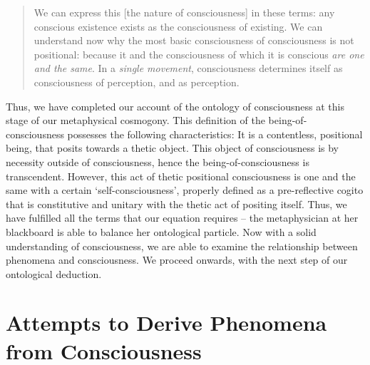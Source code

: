 \blockcquote[12]{Sartre}{We can express this [the nature of consciousness] in these terms: any conscious existence exists as the consciousness of existing. We can understand now why the most basic consciousness of consciousness is not positional: because it and the consciousness of which it is conscious \emph{are one and the same}. In a \emph{single movement}, consciousness determines itself as consciousness of perception, and as perception.}

\noindent
Thus, we have completed our account of the ontology of consciousness at this stage of our metaphysical cosmogony. This definition of the being-of-consciousness possesses the following characteristics: It is a contentless, positional being, that posits towards a thetic object. This object of consciousness is by necessity outside of consciousness, hence the being-of-consciousness is transcendent. However, this act of thetic positional consciousness is one and the same with a certain \enquote*{self-consciousness}, properly defined as a pre-reflective cogito that is constitutive and unitary with the thetic act of positing itself. Thus, we have fulfilled all the terms that our equation requires -- the metaphysician at her blackboard is able to balance her ontological particle. Now with a solid understanding of consciousness, we are able to examine the relationship between phenomena and consciousness. We proceed onwards, with the next step of our ontological deduction.


\section{Attempts to Derive Phenomena from Consciousness}


